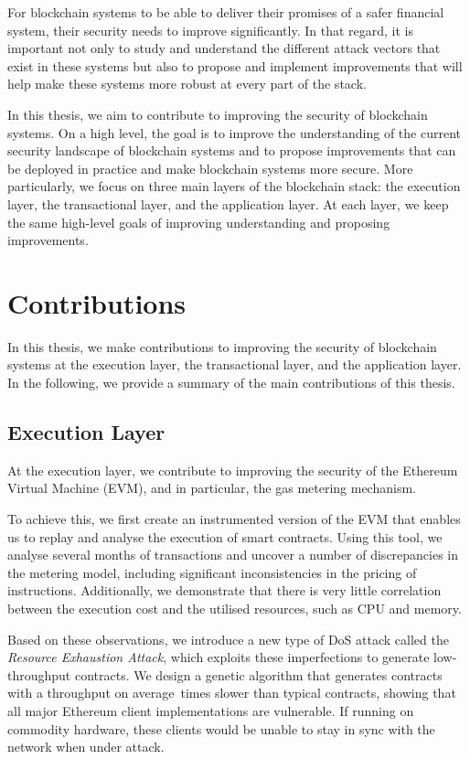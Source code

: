 For blockchain systems to be able to deliver their promises of a safer financial system, their security needs to improve significantly.
In that regard, it is important not only to study and understand the different attack vectors that exist in these systems but also to propose and implement improvements that will help make these systems more robust at every part of the stack.

In this thesis, we aim to contribute to improving the security of blockchain systems.
On a high level, the goal is to improve the understanding of the current security landscape of blockchain systems and to propose improvements that can be deployed in practice and make blockchain systems more secure.
More particularly, we focus on three main layers of the blockchain stack: the execution layer, the transactional layer, and the application layer.
At each layer, we keep the same high-level goals of improving understanding and proposing improvements.

\section{Contributions}

In this thesis, we make contributions to improving the security of blockchain systems at the execution layer, the transactional layer, and the application layer.
In the following, we provide a summary of the main contributions of this thesis.

\subsection{Execution Layer}
At the execution layer, we contribute to improving the security of the Ethereum Virtual Machine (EVM), and in particular, the gas metering mechanism.

To achieve this, we first create an instrumented version of the EVM that enables us to replay and analyse the execution of smart contracts. Using this tool, we analyse several months of transactions and uncover a number of discrepancies in the metering model, including significant inconsistencies in the pricing of instructions. Additionally, we demonstrate that there is very little correlation between the execution cost and the utilised resources, such as CPU and memory.

Based on these observations, we introduce a new type of DoS attack called the \emph{Resource Exhaustion Attack}, which exploits these imperfections to generate low-throughput contracts. We design a genetic algorithm that generates contracts with a throughput on average~\Slowdown times slower than typical contracts, showing that all major Ethereum client implementations are vulnerable. If running on commodity hardware, these clients would be unable to stay in sync with the network when under attack.

